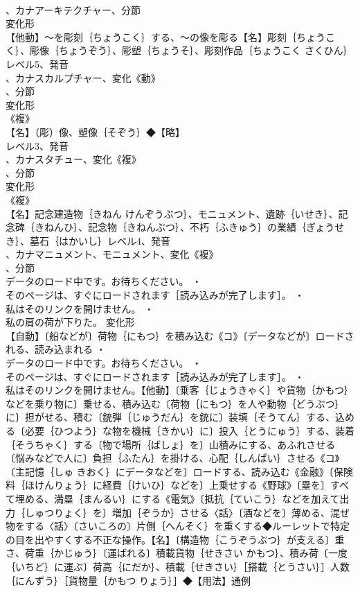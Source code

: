 \documentclass[8pt]{extreport}
\begin{document}
\begin{CJK}{UTF8}{min}
\\	、カナアーキテクチャー、分節
\\	変化形 
\\	【他動】～を彫刻｛ちょうこく｝する、～の像を彫る【名】彫刻｛ちょうこく｝、彫像｛ちょうぞう｝、彫塑｛ちょうそ｝、彫刻作品｛ちょうこく さくひん｝レベル5、発音
\\	、カナスカルプチャー、変化《動》
\\	、分節
\\	変化形 
\\	《複》
\\	【名】（彫）像、塑像｛そぞう｝◆【略】
\\	レベル3、発音
\\	、カナスタチュー、変化《複》
\\	、分節
\\	変化形 
\\	《複》
\\	【名】記念建造物｛きねん けんぞうぶつ｝、モニュメント、遺跡｛いせき｝、記念碑｛きねんひ｝、記念物｛きねんぶつ｝、不朽｛ふきゅう｝の業績｛ぎょうせき｝、墓石｛はかいし｝レベル4、発音
\\	、カナマニュメント、モニュメント、変化《複》
\\	、分節
\\	データのロード中です。お待ちください。 ・
\\	そのページは、すぐにロードされます［読み込みが完了します］。 ・
\\	私はそのリンクを開けません。 ・
\\	私の肩の荷が下りた。	変化形 
\\	【自動】〔船などが〕荷物｛にもつ｝を積み込む《コ》〔データなどが〕ロードされる、読み込まれる ・
\\	データのロード中です。お待ちください。 ・
\\	そのページは、すぐにロードされます［読み込みが完了します］。 ・
\\	私はそのリンクを開けません。【他動】〔乗客｛じょうきゃく｝や貨物｛かもつ｝などを乗り物に〕乗せる、積み込む〔荷物｛にもつ｝を人や動物｛どうぶつ｝に〕担がせる、積む〔銃弾｛じゅうだん｝を銃に〕装填｛そうてん｝する、込める〔必要｛ひつよう｝な物を機械｛きかい｝に〕投入｛とうにゅう｝する、装着｛そうちゃく｝する〔物で場所｛ばしょ｝を〕山積みにする、あふれさせる〔悩みなどで人に〕負担｛ふたん｝を掛ける、心配｛しんぱい｝させる《コ》〔主記憶｛しゅ きおく｝にデータなどを〕ロードする、読み込む《金融》〔保険料｛ほけんりょう｝に経費｛けいひ｝などを〕上乗せする《野球》〔塁を〕すべて埋める、満塁｛まんるい｝にする《電気》〔抵抗｛ていこう｝などを加えて出力｛しゅつりょく｝を〕増加｛ぞうか｝させる〈話〉〔酒などを〕薄める、混ぜ物をする〈話〉〔さいころの〕片側｛へんそく｝を重くする◆ルーレットで特定の目を出やすくする不正な操作。【名】〔構造物｛こうぞうぶつ｝が支える〕重さ、荷重｛かじゅう｝〔運ばれる〕積載貨物｛せきさい かもつ｝、積み荷〔一度｛いちど｝に運ぶ〕荷高｛にだか｝、積載｛せきさい｝［搭載｛とうさい｝］人数｛にんずう｝［貨物量｛かもつ りょう｝］◆【用法】通例

\end{CJK}
\end{document}
